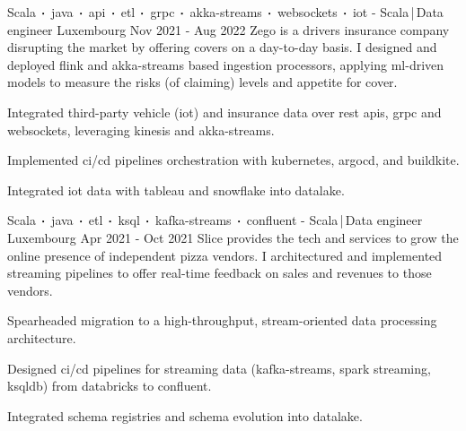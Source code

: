 \begin{cventries}

    \cventry
    {Scala$\sqbig$java$\sqbig$api$\sqbig$etl$\sqbig$grpc$\sqbig$akka-streams$\sqbig$websockets$\sqbig$iot}
    { - Scala\,|\,Data engineer}
    {Luxembourg}
    {Nov 2021 - Aug 2022}
    {Zego is a drivers insurance company disrupting the market by offering covers on a day-to-day basis. I designed and deployed flink and akka-streams based ingestion processors, applying ml-driven models to measure the risks (of claiming) levels and appetite for cover.}
    {
        \begin{cvitems}
            \item{Integrated third-party vehicle (iot) and insurance data over rest apis, grpc and websockets, leveraging kinesis and akka-streams.}
            \item{Implemented ci/cd pipelines orchestration with kubernetes, argocd, and buildkite.}
            \item{Integrated iot data with tableau and snowflake into datalake.}
        \end{cvitems}
    }


    \cventry
    {Scala$\sqbig$java$\sqbig$etl$\sqbig$ksql$\sqbig$kafka-streams$\sqbig$confluent}
    { - Scala\,|\,Data engineer}
    {Luxembourg}
    {Apr 2021 - Oct 2021}
    {Slice provides the tech and services to grow the online presence of independent pizza vendors. I architectured and implemented streaming pipelines to offer real-time feedback on sales and revenues to those vendors.}
    {
        \begin{cvitems}
            \item{Spearheaded migration to a high-throughput, stream-oriented data processing architecture.}
            \item{Designed ci/cd pipelines for streaming data (kafka-streams, spark streaming, ksqldb) from databricks to confluent.}
            \item{Integrated schema registries and schema evolution into datalake.}
        \end{cvitems}
    }


\end{cventries}
